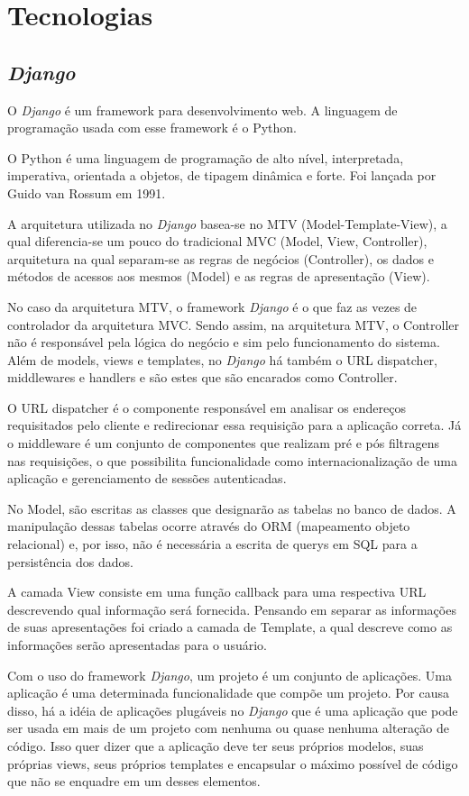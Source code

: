 \chapter{Tecnologias}

\section{\textit{Django}}
O \textit{Django} é um framework para desenvolvimento web. A linguagem de programação usada com esse framework é o Python.

O Python é uma linguagem de programação de alto nível, interpretada, imperativa, orientada a objetos, de tipagem dinâmica e forte. Foi lançada por Guido van Rossum em 1991.

A arquitetura utilizada no \textit{Django} basea-se no MTV (Model-Template-View), a qual diferencia-se um pouco do tradicional MVC (Model, View, Controller), arquitetura na qual separam-se as regras de negócios (Controller), os dados e métodos de acessos aos mesmos (Model) e as regras de apresentação (View).

No caso da arquitetura MTV, o framework \textit{Django} é o que faz as vezes de controlador da arquitetura MVC. Sendo assim, na arquitetura MTV, o Controller não é responsável pela lógica do negócio e sim pelo funcionamento do sistema. Além de models, views e templates, no \textit{Django} há também o URL dispatcher, middlewares e handlers e são estes que são encarados como Controller.

O URL dispatcher é o componente responsável em analisar os endereços requisitados pelo cliente e redirecionar essa requisição para a aplicação correta. Já o middleware é um conjunto de componentes que realizam pré e pós filtragens nas requisições, o que possibilita funcionalidade como internacionalização de uma aplicação e gerenciamento de sessões autenticadas.

No Model, são escritas as classes que designarão as tabelas no banco de dados. A manipulação dessas tabelas ocorre através do ORM (mapeamento objeto relacional) e, por isso, não é necessária a escrita de querys em SQL para a persistência dos dados.

A camada View consiste em uma função callback para uma respectiva URL descrevendo qual informação será fornecida. Pensando em separar as informações de suas apresentações foi criado a camada de Template, a qual descreve como as informações serão apresentadas para o usuário.

Com o uso do framework \textit{Django}, um projeto é um conjunto de aplicações. Uma aplicação é uma determinada funcionalidade que compõe um projeto. Por causa disso, há a idéia de aplicações plugáveis no \textit{Django} que é uma aplicação que pode ser usada em mais de um projeto com nenhuma ou quase nenhuma alteração de código. Isso quer dizer que a aplicação deve ter seus próprios modelos, suas próprias views, seus próprios templates e encapsular o máximo possível de código que não se enquadre em um desses elementos.

